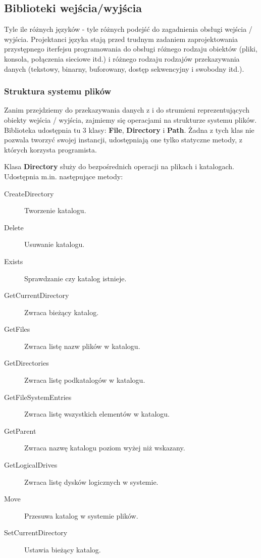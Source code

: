 \subsection{Biblioteki wejścia/wyjścia}

Tyle ile różnych języków - tyle różnych podejść do zagadnienia obsługi wejścia / wyjścia. 
Projektanci języka stają przed trudnym zadaniem zaprojektowania przystępnego iterfejsu programowania
do obsługi różnego rodzaju obiektów (pliki, konsola, połączenia sieciowe itd.) i różnego rodzaju 
rodzajów przekazywania danych (tekstowy, binarny, buforowany, dostęp sekwencyjny i swobodny itd.).

\subsubsection{Struktura systemu plików}

Zanim przejdziemy do przekazywania danych z i do strumieni reprezentujących obiekty wejścia / wyjścia, 
zajmiemy się operacjami na strukturze systemu plików. Biblioteka udostępnia tu 3 klasy: {\bf File}, 
{\bf Directory} i {\bf Path}. Żadna z tych klas nie pozwala tworzyć swojej instancji, udostępniają 
one tylko statyczne metody, z których korzysta programista.

Klasa {\bf Directory} służy do bezpośrednich operacji na plikach i katalogach. Udostępnia m.in.
następujące metody:
\begin{description}
\item [CreateDirectory] Tworzenie katalogu.
\item [Delete] Usuwanie katalogu.
\item [Exists] Sprawdzanie czy katalog istnieje.
\item [GetCurrentDirectory] Zwraca bieżący katalog.
\item [GetFiles] Zwraca listę nazw plików w katalogu.
\item [GetDirectories] Zwraca listę podkatalogów w katalogu.
\item [GetFileSystemEntries] Zwraca listę wszystkich elementów w katalogu.
\item [GetParent] Zwraca nazwę katalogu poziom wyżej niż wskazany.
\item [GetLogicalDrives] Zwraca listę dysków logicznych w systemie.
\item [Move] Przesuwa katalog w systemie plików.
\item [SetCurrentDirectory] Ustawia bieżący katalog.
\end{description}

